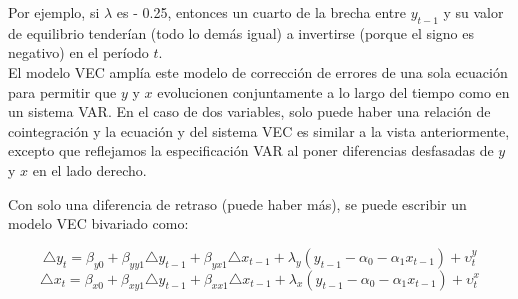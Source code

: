 	
	
	Por ejemplo, si $\lambda$ es - 0.25, entonces un cuarto de la brecha entre $y_{t - 1}$ y su valor de equilibrio tender\'{i}an (todo lo dem\'as igual) a invertirse (porque el signo es negativo) en el período $t$.\\
	\vspace{4mm}	
	El modelo VEC ampl\'{i}a este modelo de correcci\'on de errores de una sola ecuaci\'on para permitir que $y$ y $x$ evolucionen conjuntamente a lo largo del tiempo como en un sistema VAR. En el caso de dos variables, solo puede haber una relaci\'on de cointegraci\'on y la ecuaci\'on y del sistema VEC es similar a la vista anteriormente, excepto que reflejamos la especificación VAR al poner diferencias desfasadas de $y$ y $x$ en el lado derecho. 
	



%	
	Con solo una diferencia de retraso (puede haber m\'as), se puede escribir un modelo VEC bivariado como:
	
	\begin{equation}
	\triangle y_t = \beta_{y0} + \beta_{yy1} \triangle y_{t-1} + \beta_{yx1} \triangle x_{t-1} + \lambda_y (y_{t-1} - \alpha_0 - \alpha_1 x_{t-1} ) + \upsilon^y_t
	\end{equation}
	\begin{equation}
	\triangle x_t = \beta_{x0} + \beta_{xy1} \triangle y_{t-1} + \beta_{xx1} \triangle x_{t-1} + \lambda_x (y_{t-1} - \alpha_0 - \alpha_1 x_{t-1} ) + \upsilon^x_t
	\end{equation}
	

	
